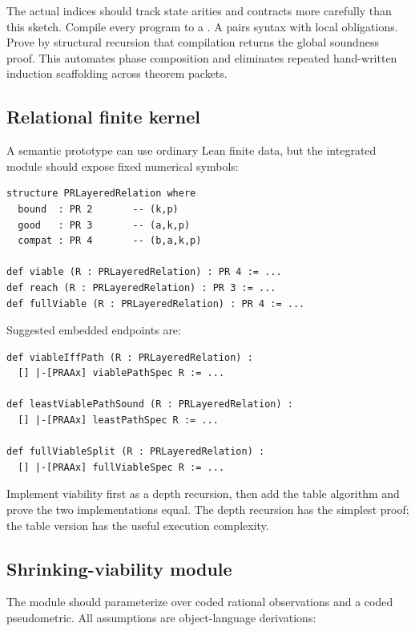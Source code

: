 The actual indices should track state arities and contracts more carefully than
this sketch.  Compile every program to a .  A
 pairs syntax with local  obligations.
Prove by structural recursion that compilation returns the global soundness
proof.  This automates phase composition and eliminates repeated hand-written
induction scaffolding across theorem packets.

\subsection{Relational finite kernel}

A semantic prototype can use ordinary Lean finite data, but the integrated
module should expose fixed numerical symbols:

\begin{lstlisting}[style=lean]
structure PRLayeredRelation where
  bound  : PR 2       -- (k,p)
  good   : PR 3       -- (a,k,p)
  compat : PR 4       -- (b,a,k,p)

def viable (R : PRLayeredRelation) : PR 4 := ...
def reach (R : PRLayeredRelation) : PR 3 := ...
def fullViable (R : PRLayeredRelation) : PR 4 := ...
\end{lstlisting}

Suggested embedded endpoints are:

\begin{lstlisting}[style=lean]
def viableIffPath (R : PRLayeredRelation) :
  [] |-[PRAAx] viablePathSpec R := ...

def leastViablePathSound (R : PRLayeredRelation) :
  [] |-[PRAAx] leastPathSpec R := ...

def fullViableSplit (R : PRLayeredRelation) :
  [] |-[PRAAx] fullViableSpec R := ...
\end{lstlisting}

Implement viability first as a depth recursion, then add the table algorithm
and prove the two implementations equal.  The depth recursion has the simplest
proof; the table version has the useful execution complexity.

\subsection{Shrinking-viability module}

The module  should parameterize over coded
rational observations and a coded pseudometric.  All assumptions are
object-language derivations:

